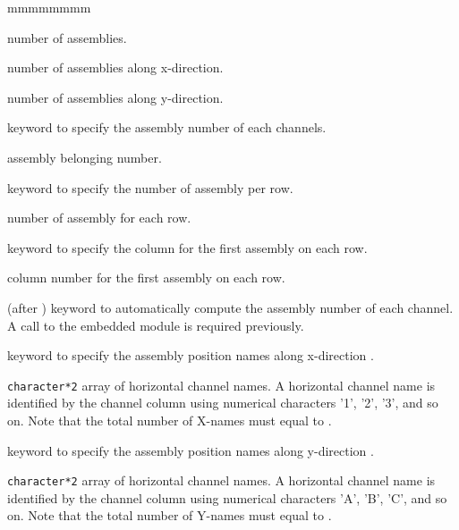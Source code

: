 \begin{ListeDeDescription}{mmmmmmmm}
\item[\dusa{na}] number of assemblies. 

\item[\dusa{nax}] number of assemblies along x-direction. 

\item[\dusa{nay}] number of assemblies along y-direction.

\item[\moc{A-ZONE}] keyword to specify the assembly number  of each channels. 

\item[\dusa{iza}] assembly belonging number. 

\item[\moc{A-NX}] keyword to specify the number of assembly  per row. 

\item[\dusa{nbax}] number of assembly for each row. 

\item[\moc{A-IBX}] keyword to specify the column for the first assembly  on each row. 

\item[\dusa{ibax}] column number for the first assembly on each row. 

\item[\moc{ASBLY}] (after ) keyword to automatically compute the assembly number of each channel. A call to the embedded module   is required previously.

\item[\moc{AXNAME}] keyword to specify the assembly position names along x-direction .

\item[\dusa{XNAMEA}] \texttt{character*2} array of horizontal channel
names. A horizontal channel name is identified by the channel column
using numerical characters '1', '2', '3', and so on.
Note that the total number of X-names must equal to . 

\item[\moc{AYNAME}] keyword to specify the assembly position names along y-direction .

\item[\dusa{YNAMEA}]  \texttt{character*2} array of horizontal channel
names. A horizontal channel name is identified by the channel column
using numerical characters 'A', 'B', 'C', and so on.
Note that the total number of Y-names must equal to .  


\end{ListeDeDescription}
